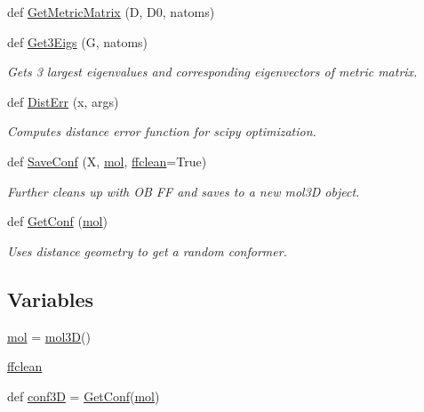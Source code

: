 \begin{DoxyCompactItemize}
def \hyperlink{namespacemolSimplify_1_1distgeom_a6d508087b38951d64ecc00438d3139d3}{Get\+Metric\+Matrix} (D, D0, natoms)
\item 
def \hyperlink{namespacemolSimplify_1_1distgeom_a2a9f4b671337bde3a1a15d9adef28959}{Get3\+Eigs} (G, natoms)
\begin{DoxyCompactList}\small\item\em Gets 3 largest eigenvalues and corresponding eigenvectors of metric matrix. \end{DoxyCompactList}\item 
def \hyperlink{namespacemolSimplify_1_1distgeom_a9393f464d0cdef4e6ad87bcc895767d2}{Dist\+Err} (x, args)
\begin{DoxyCompactList}\small\item\em Computes distance error function for scipy optimization. \end{DoxyCompactList}\item 
def \hyperlink{namespacemolSimplify_1_1distgeom_a10453db24bcddc639b204904f395b0be}{Save\+Conf} (X, \hyperlink{namespacemolSimplify_1_1distgeom_a1ec709e458f1fd6d747723c8b11e8c01}{mol}, \hyperlink{namespacemolSimplify_1_1distgeom_af6f56fc1cd06c121370cfa2a22683a53}{ffclean}=True)
\begin{DoxyCompactList}\small\item\em Further cleans up with OB FF and saves to a new mol3D object. \end{DoxyCompactList}\item 
def \hyperlink{namespacemolSimplify_1_1distgeom_ae5eb55abad68fccba5f8fa87b706d7a3}{Get\+Conf} (\hyperlink{namespacemolSimplify_1_1distgeom_a1ec709e458f1fd6d747723c8b11e8c01}{mol})
\begin{DoxyCompactList}\small\item\em Uses distance geometry to get a random conformer. \end{DoxyCompactList}\end{DoxyCompactItemize}
\subsection*{Variables}
\begin{DoxyCompactItemize}
\item 
\hyperlink{namespacemolSimplify_1_1distgeom_a1ec709e458f1fd6d747723c8b11e8c01}{mol} = \hyperlink{classmolSimplify_1_1Classes_1_1mol3D_1_1mol3D}{mol3D}()
\item 
\hyperlink{namespacemolSimplify_1_1distgeom_af6f56fc1cd06c121370cfa2a22683a53}{ffclean}
\item 
def \hyperlink{namespacemolSimplify_1_1distgeom_a635b102e04affd33a6b7c8322c3efa6b}{conf3D} = \hyperlink{namespacemolSimplify_1_1distgeom_ae5eb55abad68fccba5f8fa87b706d7a3}{Get\+Conf}(\hyperlink{namespacemolSimplify_1_1distgeom_a1ec709e458f1fd6d747723c8b11e8c01}{mol})
\end{DoxyCompactItemize}


